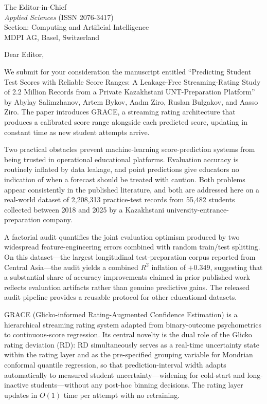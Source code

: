 \documentclass[12pt]{letter}
\date{8 October 2026}
\begin{document}
\begin{letter}{The Editor-in-Chief \\
\textit{Applied Sciences} (ISSN 2076-3417) \\
Section: Computing and Artificial Intelligence \\
MDPI AG, Basel, Switzerland}

\opening{Dear Editor,}

We submit for your consideration the manuscript entitled ``Predicting Student Test Scores with
Reliable Score Ranges: A Leakage-Free Streaming-Rating Study of 2.2 Million Records from a
Private Kazakhstani UNT-Preparation Platform'' by Abylay Salimzhanov, Artem Bykov,
Aadm Ziro, Ruslan Bulgakov, and Aasso Ziro. The paper introduces GRACE, a streaming rating architecture that produces a calibrated
score range alongside each predicted score, updating in constant time as new student attempts
arrive.

Two practical obstacles prevent machine-learning score-prediction systems from being trusted in
operational educational platforms. Evaluation accuracy is routinely inflated by data leakage, and
point predictions give educators no indication of when a forecast should be treated with caution.
Both problems appear consistently in the published literature, and both are addressed here on a
real-world dataset of 2,208,313 practice-test records from 55,482 students collected between 2018
and 2025 by a Kazakhstani university-entrance-preparation company.

A factorial audit quantifies the joint evaluation optimism produced by two widespread
feature-engineering errors combined with random train/test splitting. On this dataset---the
largest longitudinal test-preparation corpus reported from Central Asia---the audit yields a
combined $R^2$ inflation of $+0.349$, suggesting that a substantial share of accuracy
improvements claimed in prior published work reflects evaluation artifacts rather than genuine
predictive gains. The released audit pipeline provides a reusable protocol for other educational
datasets.

GRACE (Glicko-informed Rating-Augmented Confidence Estimation) is a hierarchical streaming
rating system adapted from binary-outcome psychometrics to continuous-score regression. Its
central novelty is the dual role of the Glicko rating deviation (RD): RD simultaneously serves as
a real-time uncertainty state within the rating layer and as the pre-specified grouping variable
for Mondrian conformal quantile regression, so that prediction-interval width adapts automatically
to measured student uncertainty---widening for cold-start and long-inactive students---without any
post-hoc binning decisions. The rating layer updates in $O(1)$ time per attempt with no
retraining.


\end{letter}
\end{document}
